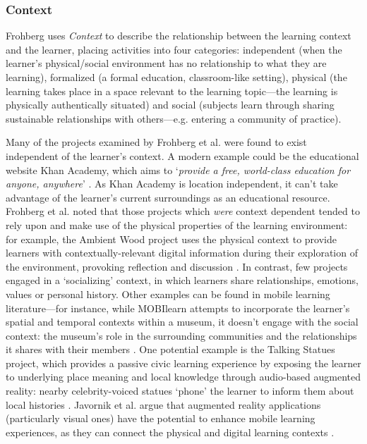 \subsubsection{Context}
Frohberg uses \textit{Context} to describe the relationship between the learning context and the learner, placing activities into four categories: independent (when the learner's physical/social environment has no relationship to what they are learning), formalized (a formal education, classroom-like setting), physical (the learning takes place in a space relevant to the learning topic---the learning is physically authentically situated) and social (subjects learn through sharing sustainable relationships with others---e.g. entering a community of practice). 

Many of the projects examined by Frohberg et al. were found to exist independent of the learner’s context. A modern example could be the educational website Khan Academy, which aims to ‘\textit{provide a free, world-class education for anyone, anywhere}’ \citep{Khan2011}. As Khan Academy is location independent, it can’t take advantage of the learner’s current surroundings as an educational resource. Frohberg et al. noted that those projects which \textit{were} context dependent tended to rely upon and make use of the physical properties of the learning environment: for example, the Ambient Wood project uses the physical context to provide learners with contextually-relevant digital information during their exploration of the environment, provoking reflection and discussion \citep{Rogers2004}. In contrast, few projects engaged in a `socializing' context, in which learners share relationships, emotions, values or personal history. Other examples can be found in mobile learning literature---for instance, while MOBIlearn attempts to incorporate the learner’s spatial and temporal contexts within a museum, it doesn't engage with the social context: the museum’s role in the surrounding communities and the relationships it shares with their members \citep{Lonsdale2004}. One potential example is the Talking Statues project, which provides a passive civic learning experience by exposing the learner to underlying place meaning and local knowledge through audio-based augmented reality: nearby celebrity-voiced statues ‘phone’ the learner to inform them about local histories \citep{Sing2017}. Javornik et al. argue that augmented reality applications (particularly visual ones) have the potential to enhance mobile learning experiences, as they can connect the physical and digital learning contexts \citep{javornik2019}. 

